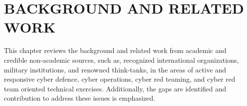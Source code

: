 \section{BACKGROUND AND RELATED WORK}
\label{sec:background}
\glsresetall

This chapter reviews the background and related work from academic and credible non-academic sources, such as, recognized international organizations, military institutions, and renowned think-tanks, in the areas of active and responsive cyber defence, cyber operations, cyber red teaming, and cyber red team oriented technical exercises.
Additionally, the gaps are identified and contribution to address these issues is emphasized.








